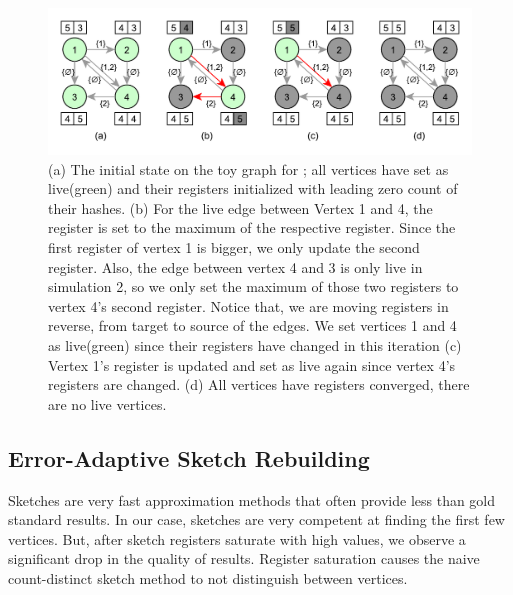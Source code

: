 \documentclass[10pt,journal,compsoc]{IEEEtran}
\newcommand\acro{{\sc{HyperFuseR\xspace}\xspace}\xspace}
\begin{document}
\begin{figure}[!ht]
    \begin{center}
    \includegraphics[width=\linewidth]{images/sketch-diffusion.pdf}
    \caption{(a) The initial state on the toy graph for \acro{}; all vertices have set as live(green) and their registers initialized with leading zero count of their hashes. (b) 
    For the live edge between Vertex 1 and 4, the register is set to the maximum of the respective register. Since the first register of vertex 1 is bigger, we only update the second register. Also, the edge between vertex 4 and 3 is only live in simulation 2, so we only set the maximum of those two registers to vertex 4's second register. Notice that, we are moving registers in reverse, from target to source of the edges. We set vertices 1 and 4 as live(green) since their registers have changed in this iteration (c) Vertex 1's register is updated and set as live again since vertex 4's registers are changed.  (d) All vertices have registers converged, there are no live vertices. }\label{fig:hf-processing} 
    \end{center}
    \end{figure}
\subsection{Error-Adaptive Sketch Rebuilding}

Sketches are very fast approximation methods that often provide less than gold standard results. In our case, sketches are very competent at finding the first few vertices. But, after sketch registers saturate with high values, we observe a significant drop in the quality of results. Register saturation causes the naive count-distinct sketch method to not distinguish between vertices. 
\end{document}
